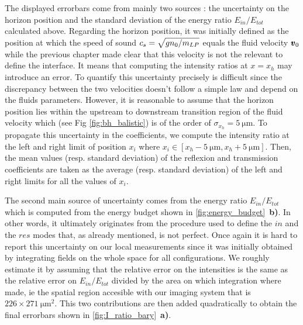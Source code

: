 The displayed errorbars come from mainly two sources : the uncertainty on the horizon position and the standard deviation of the energy ratio $E_{in}/E_{tot}$ calculated above.
Regarding the horizon position, it was initially defined as the position at which the speed of sound $c_s=\sqrt{gn_0/m_{LP}}$ equals the fluid velocity $\pmb{v}_0$ while the previous chapter made clear
that this velocity is not the relevant to define the interface. It means that computing the intensity ratios at $x=x_h$ may introduce an error. To quantify this uncertainty precisely is 
difficult since the discrepancy between the two velocities doesn't follow a simple law and depend on the fluids parameters. However, it is reasonable to assume that the horizon position lies within the upstream to downstream transition region of the fluid velocity which (see Fig \ref{fig:bh_balistic}) is of the order of $\sigma_{x_h}=\SI{5}{\micro \meter}$.
To propagate this uncertainty in the coefficients, we compute the intensity ratio at the left and right limit of position $x_i$ where $x_i \in [x_h-\SI{5}{\micro \meter}, x_h+\SI{5}{\micro \meter}]$. Then,
the mean values (resp. standard deviation) of the reflexion and transmission coefficients are taken as the average (resp. standard deviation) of the left and right limits for all the values of $x_i$. 

The second main source of uncertainty comes from the energy ratio $E_{in}/E_{tot}$ which is computed from the energy budget shown in \autoref{fig:energy_budget}~\textbf{b)}.
In other words, it ultimately originates from the procedure used to define the $in$ and the $res$ modes that, as already mentioned, is not perfect.
Once again it is hard to report this uncertainty on our local measurements since it was initially obtained by integrating fields on the whole space for all configurations.
We roughly estimate it by assuming that the relative error on the intensities is the same as the relative error on $E_{in}/E_{tot}$ divided by the area on which integration where made, ie the spatial region accesible with our imaging system that is $226\times\SI{271}{ \micro \meter \squared}$.
This two contributions are then added quadratically to obtain the final errorbars shown in \autoref{fig:I_ratio_bary}~\textbf{a)}.

